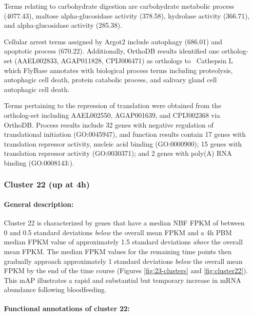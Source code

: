 


Terms relating to carbohydrate digestion are carbohydrate metabolic process (4077.43), maltose alpha-glucosidase activity (378.58), hydrolase activity (366.71), and alpha-glucosidase activity (285.38).

Cellular arrest terms assigned by \gls{Argot2} include autophagy (686.01) and apoptotic process (670.22).
%
Additionally, OrthoDB results identified one ortholog-set (AAEL002833, AGAP011828, CPIJ006471) as orthologs to \Dm\ Cathepsin L which FlyBase annotates with biological process terms including proteolysis, autophagic cell death, protein catabolic process, and salivary gland cell autophagic cell death.
%

Terms pertaining to the repression of translation were obtained from the ortholog-set including AAEL002550, AGAP001639, and CPIJ002368 via OrthoDB.
%
Process results include 32 genes with negative regulation of translational initiation (GO:0045947), and function results contain 17 genes with translation repressor activity, nucleic acid binding (GO:0000900); 15 genes with translation repressor activity (GO:0030371); and 2 genes with  poly(A) RNA binding (GO:0008143:).



\subsubsection{Cluster 22 (up at 4h)}

\paragraph*{General description:}

Cluster 22 is characterized by genes that have a median \gls{NBF} \gls{FPKM} of between 0 and 0.5 standard deviations \textit{below} the overall mean \gls{FPKM} and a 4h \gls{PBM} median \gls{FPKM} value of approximately 1.5 standard deviations \textit{above} the overall mean \gls{FPKM}. The median \gls{FPKM} values for the remaining time points then gradually approach approximately 1 standard deviations \textit{below} the overall mean \gls{FPKM} by the end of the time course (Figures \ref{fig:23-clusters} and \ref{fig:cluster22}).
%
This \gls{mAP} illustrates a rapid and substantial but temporary increase in mRNA abundance following bloodfeeding.
%



\paragraph*{Functional annotations of cluster 22:}

